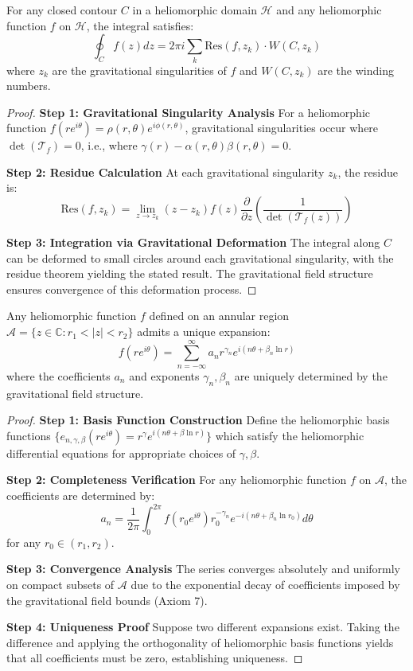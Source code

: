 \begin{theorem}
\label{thm:heliomorphic_integration}
For any closed contour $C$ in a heliomorphic domain $\mathcal{H}$ and any heliomorphic function $f$ on $\mathcal{H}$, the integral satisfies:
$$\oint_C f(z) dz = 2\pi i \sum_{k} \text{Res}(f, z_k) \cdot W(C, z_k)$$
where $z_k$ are the gravitational singularities of $f$ and $W(C, z_k)$ are the winding numbers.
\end{theorem}

\begin{proof}
\textbf{Step 1: Gravitational Singularity Analysis}
For a heliomorphic function $f(re^{i\theta}) = \rho(r,\theta) e^{i\phi(r,\theta)}$, gravitational singularities occur where $\det(\mathcal{T}_f) = 0$, i.e., where $\gamma(r) - \alpha(r,\theta)\beta(r,\theta) = 0$.

\textbf{Step 2: Residue Calculation}
At each gravitational singularity $z_k$, the residue is:
$$\text{Res}(f, z_k) = \lim_{z \to z_k} (z - z_k) f(z) \frac{\partial}{\partial z}\left(\frac{1}{\det(\mathcal{T}_f(z))}\right)$$

\textbf{Step 3: Integration via Gravitational Deformation}
The integral along $C$ can be deformed to small circles around each gravitational singularity, with the residue theorem yielding the stated result. The gravitational field structure ensures convergence of this deformation process.
\end{proof}

\begin{theorem}
\label{thm:heliomorphic_laurent}
Any heliomorphic function $f$ defined on an annular region $\mathcal{A} = \{z \in \mathbb{C} : r_1 < |z| < r_2\}$ admits a unique expansion:
$$f(re^{i\theta}) = \sum_{n=-\infty}^{\infty} a_n r^{\gamma_n} e^{i(n\theta + \beta_n \ln r)}$$
where the coefficients $a_n$ and exponents $\gamma_n, \beta_n$ are uniquely determined by the gravitational field structure.
\end{theorem}

\begin{proof}
\textbf{Step 1: Basis Function Construction}
Define the heliomorphic basis functions $\{e_{n,\gamma,\beta}(re^{i\theta}) = r^\gamma e^{i(n\theta + \beta \ln r)}\}$ which satisfy the heliomorphic differential equations for appropriate choices of $\gamma, \beta$.

\textbf{Step 2: Completeness Verification}
For any heliomorphic function $f$ on $\mathcal{A}$, the coefficients are determined by:
$$a_n = \frac{1}{2\pi} \int_0^{2\pi} f(r_0 e^{i\theta}) r_0^{-\gamma_n} e^{-i(n\theta + \beta_n \ln r_0)} d\theta$$
for any $r_0 \in (r_1, r_2)$.

\textbf{Step 3: Convergence Analysis}
The series converges absolutely and uniformly on compact subsets of $\mathcal{A}$ due to the exponential decay of coefficients imposed by the gravitational field bounds (Axiom 7).

\textbf{Step 4: Uniqueness Proof}
Suppose two different expansions exist. Taking the difference and applying the orthogonality of heliomorphic basis functions yields that all coefficients must be zero, establishing uniqueness.
\end{proof}

